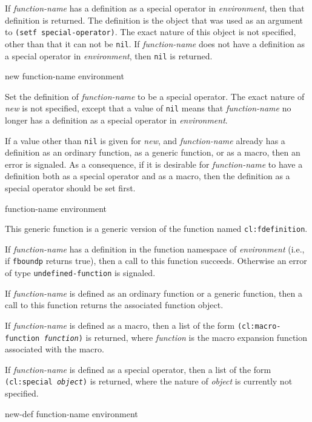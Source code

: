 If \textit{function-name} has a definition as a special operator in
\textit{environment}, then that definition is returned.  The
definition is the object that was used as an argument to \texttt{(setf
  special-operator)}.  The exact nature of this object is not
specified, other than that it can not be \texttt{nil}.  If
\textit{function-name} does not have a definition as a special
operator in \textit{environment}, then \texttt{nil} is returned.

 {new function-name environment}

Set the definition of \textit{function-name} to be a special operator.
The exact nature of \textit{new} is not specified, except that a
value of \texttt{nil} means that \textit{function-name} no longer has
a definition as a special operator in \textit{environment}.

If a value other than \texttt{nil} is given for \textit{new}, and
\textit{function-name} already has a definition as an ordinary
function, as a generic function, or as a macro, then an error is
signaled.  As a consequence, if it is desirable for
\textit{function-name} to have a definition both as a special operator
and as a macro, then the definition as a special operator should be
set first.

 {function-name environment}

This generic function is a generic version of the \commonlisp{}
function named \texttt{cl:fdefinition}.

If \textit{function-name} has a definition in the function namespace
of \textit{environment} (i.e., if \texttt{fboundp} returns true), then
a call to this function succeeds.  Otherwise an error of type
\texttt{undefined-function} is signaled.

If \textit{function-name} is defined as an ordinary function or a generic
function, then a call to this function returns the associated
function object.

If \textit{function-name} is defined as a macro, then a list of the form
\texttt{(cl:macro-function \textrm{\textit{function}})} is returned, where
\textit{function} is the macro expansion function associated with the
macro.

If \textit{function-name} is defined as a special operator, then a
list of the form \texttt{(cl:special \textrm{\textit{object}})} is
returned, where the nature of \textit{object} is currently not
specified.

 {new-def function-name environment}

